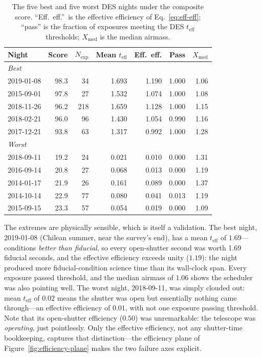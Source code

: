 \documentclass[11pt]{article}
\newcommand{\teff}{t_{\mathrm{eff}}}
\begin{document}
\begin{table}[htbp]
  \centering
  \caption{The five best and five worst DES nights under the composite score.
    ``Eff.\ eff.''\ is the effective efficiency of Eq.~\eqref{eq:eff-eff};
    ``pass'' is the fraction of exposures meeting the DES $\teff$ thresholds;
    $X_{\mathrm{med}}$ is the median airmass.}
  \label{tab:nights}
  \begin{tabular}{lrrrrrr}
    \toprule
    Night & Score & $N_{\mathrm{exp}}$ & Mean $\teff$ & Eff.\ eff. & Pass & $X_{\mathrm{med}}$ \\
    \midrule
    \multicolumn{7}{l}{\emph{Best}} \\
    2019-01-08 & 98.3 &  34 & 1.693 & 1.190 & 1.000 & 1.06 \\
    2015-09-01 & 97.8 &  27 & 1.532 & 1.074 & 1.000 & 1.08 \\
    2018-11-26 & 96.2 & 218 & 1.659 & 1.128 & 1.000 & 1.15 \\
    2018-02-21 & 96.0 &  96 & 1.430 & 1.054 & 0.990 & 1.16 \\
    2017-12-21 & 93.8 &  63 & 1.317 & 0.992 & 1.000 & 1.28 \\
    \midrule
    \multicolumn{7}{l}{\emph{Worst}} \\
    2018-09-11 & 19.2 &  24 & 0.021 & 0.010 & 0.000 & 1.31 \\
    2016-09-14 & 20.8 &  27 & 0.068 & 0.013 & 0.000 & 1.19 \\
    2014-01-17 & 21.9 &  26 & 0.161 & 0.089 & 0.000 & 1.37 \\
    2014-10-14 & 22.9 &  77 & 0.080 & 0.041 & 0.013 & 1.19 \\
    2015-09-15 & 23.3 &  57 & 0.054 & 0.019 & 0.000 & 1.09 \\
    \bottomrule
  \end{tabular}
\end{table}

The extremes are physically sensible, which is itself a validation. The best night,
2019-01-08 (Chilean summer, near the survey's end), has a mean $\teff$ of
$1.69$---conditions \emph{better than fiducial}, so every open-shutter second was
worth 1.69 fiducial seconds, and the effective efficiency exceeds unity ($1.19$): the
night produced more fiducial-condition science time than its wall-clock span. Every
exposure passed threshold, and the median airmass of $1.06$ shows the scheduler was
also pointing well. The worst night, 2018-09-11, was simply clouded out: mean $\teff$
of $0.02$ means the shutter was open but essentially nothing came through---an
effective efficiency of $0.01$, with not one exposure passing threshold. Note that
its open-shutter efficiency ($0.50$) was unremarkable: the telescope was
\emph{operating}, just pointlessly. Only the effective efficiency, not any
shutter-time bookkeeping, captures that distinction---the efficiency plane of
Figure~\ref{fig:efficiency-plane} makes the two failure axes explicit.
\end{document}
